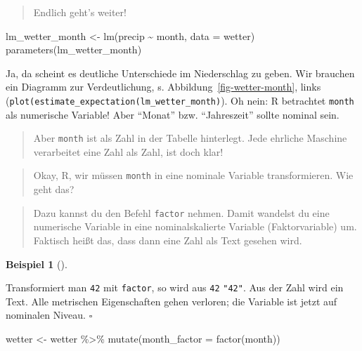 \documentclass[
  letterpaper,
  twoside,
  open=any]{scrbook}
\newenvironment{Shaded}{\begin{snugshade}}{\end{snugshade}}
\newcommand{\AttributeTok}[1]{\textcolor[rgb]{0.40,0.45,0.13}{#1}}
\newcommand{\FunctionTok}[1]{\textcolor[rgb]{0.28,0.35,0.67}{#1}}
\newcommand{\NormalTok}[1]{\textcolor[rgb]{0.00,0.23,0.31}{#1}}
\newcommand{\OtherTok}[1]{\textcolor[rgb]{0.00,0.23,0.31}{#1}}
\newcommand{\SpecialCharTok}[1]{\textcolor[rgb]{0.37,0.37,0.37}{#1}}
\theoremstyle{definition}
\theoremstyle{definition}
\theoremstyle{definition}
\newtheorem{example}{Beispiel}[chapter]
\theoremstyle{remark}
\begin{document}
\begin{quote}
{} Endlich geht's weiter!
\end{quote}

\begin{Shaded}
\begin{Highlighting}[]
\NormalTok{lm\_wetter\_month }\OtherTok{\textless{}{-}} \FunctionTok{lm}\NormalTok{(precip }\SpecialCharTok{\textasciitilde{}}\NormalTok{ month, }\AttributeTok{data =}\NormalTok{ wetter)}
\FunctionTok{parameters}\NormalTok{(lm\_wetter\_month)}
\end{Highlighting}
\end{Shaded}

Ja, da scheint es deutliche Unterschiede im Niederschlag zu geben. Wir
brauchen ein Diagramm zur Verdeutlichung, s.
Abbildung~\ref{fig-wetter-month}, links
(\texttt{plot(estimate\_expectation(lm\_wetter\_month)}). Oh nein: R
betrachtet \texttt{month} als numerische Variable! Aber \enquote{Monat}
bzw. \enquote{Jahreszeit} sollte nominal sein.

\begin{quote}
{} Aber \texttt{month} ist als Zahl in der Tabelle
hinterlegt. Jede ehrliche Maschine verarbeitet eine Zahl als Zahl, ist
doch klar!
\end{quote}

\begin{quote}
{} Okay, R, wir müssen \texttt{month} in eine nominale
Variable transformieren. Wie geht das?
\end{quote}

\begin{quote}
{} Dazu kannst du den Befehl \texttt{factor} nehmen. Damit
wandelst du eine numerische Variable in eine nominalskalierte Variable
(Faktorvariable) um. Faktisch heißt das, dass dann eine Zahl als Text
gesehen wird.
\end{quote}

\begin{example}[]\protect\hypertarget{exm-factor}{}\label{exm-factor}

Transformiert man \texttt{42} mit \texttt{factor}, so wird aus
\texttt{42} \texttt{"42"}. Aus der Zahl wird ein Text. Alle metrischen
Eigenschaften gehen verloren; die Variable ist jetzt auf nominalen
Niveau. \(\square\)

\end{example}

\begin{Shaded}
\begin{Highlighting}[]
\NormalTok{wetter }\OtherTok{\textless{}{-}}
\NormalTok{  wetter }\SpecialCharTok{\%\textgreater{}\%} 
  \FunctionTok{mutate}\NormalTok{(}\AttributeTok{month\_factor =} \FunctionTok{factor}\NormalTok{(month))}
\end{Highlighting}
\end{Shaded}
\end{document}
